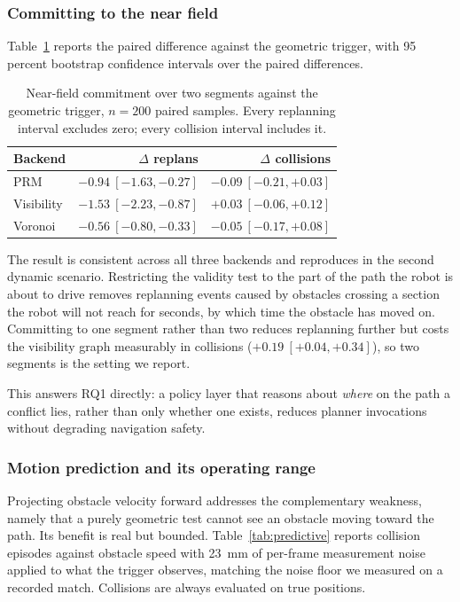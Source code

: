 \subsubsection{Committing to the near field}

Table~\ref{tab:nearfield} reports the paired difference against the geometric
trigger, with 95 percent bootstrap confidence intervals over the paired
differences.

\begin{table}[t]
\centering
\small
\begin{tabular}{lrr}
\hline
Backend & $\Delta$ replans & $\Delta$ collisions \\
\hline
PRM        & $-0.94\ [-1.63, -0.27]$ & $-0.09\ [-0.21, +0.03]$ \\
Visibility & $-1.53\ [-2.23, -0.87]$ & $+0.03\ [-0.06, +0.12]$ \\
Voronoi    & $-0.56\ [-0.80, -0.33]$ & $-0.05\ [-0.17, +0.08]$ \\
\hline
\end{tabular}
\caption{Near-field commitment over two segments against the geometric
trigger, $n=200$ paired samples. Every replanning interval excludes zero;
every collision interval includes it.}
\label{tab:nearfield}
\end{table}

The result is consistent across all three backends and reproduces in the second
dynamic scenario. Restricting the validity test to the part of the path the
robot is about to drive removes replanning events caused by obstacles crossing
a section the robot will not reach for seconds, by which time the obstacle has
moved on. Committing to one segment rather than two reduces replanning further
but costs the visibility graph measurably in collisions
($+0.19\ [+0.04, +0.34]$), so two segments is the setting we report.

This answers RQ1 directly: a policy layer that reasons about \emph{where} on
the path a conflict lies, rather than only whether one exists, reduces
planner invocations without degrading navigation safety.

\subsubsection{Motion prediction and its operating range}

Projecting obstacle velocity forward addresses the complementary weakness,
namely that a purely geometric test cannot see an obstacle moving toward the
path. Its benefit is real but bounded. Table~\ref{tab:predictive} reports
collision episodes against obstacle speed with 23~mm of per-frame measurement
noise applied to what the trigger observes, matching the noise floor we measured
on a recorded match. Collisions are always evaluated on true positions.

